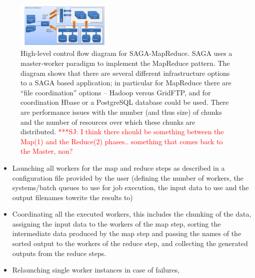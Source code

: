 \documentclass[conference,final]{IEEEtran}
\newcommand{\jhanote}[1]{ {\textcolor{red} { ***SJ: #1 }}}
\newcommand{\jhanote}[1]{}
\begin{document}
\begin{figure}[t]
      \centering
          \includegraphics[width=0.4\textwidth]{saga-mapreduce_controlflow.png}
          \caption{High-level control flow diagram for
            SAGA-MapReduce. SAGA uses a master-worker paradigm to
            implement the MapReduce pattern. The diagram shows that
            there are several different infrastructure options to a
            SAGA based application; in particular for MapReduce there
            are ``file coordination'' options -- Hadoop versus
            GridFTP, and for coordination Hbase or a PostgreSQL
            database could be used. There are performance issues with
            the number (and thus size) of chunks and the number of
            resources over which these chunks are distributed.
            \jhanote{I think there should be something between the
              Map(1) and the Reduce(2) phases.. something that comes
              back to the Master, non?}}
      \label{saga-mapreduce_controlflow}
\end{figure}

\begin{itemize}
\item Launching all workers for the map and reduce steps as described
  in a configuration file provided by the user (defining the number of
  workers, the systems/batch queues to use for job execution, the
  input data to use and the output filenames towrite the results to)
\item Coordinating all the executed workers, this includes the
  chunking of the data, assigning the input data to the workers of the
  map step, sorting the intermediate data produced by the map step and
  passing the names of the sorted output to
  the workers of the reduce step, and collecting the generated outputs
  from the reduce steps.
\item Relaunching single worker instances in case of failures,
\end{itemize}
\end{document}
